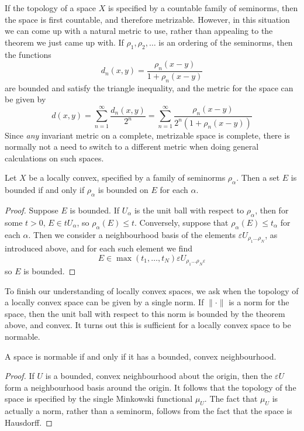 If the topology of a space $X$ is specified by a countable family of seminorms, then the space is first countable, and therefore metrizable. However, in this situation we can come up with a natural metric to use, rather than appealing to the theorem we just came up with. If $\rho_1, \rho_2, \dots$ is an ordering of the seminorms, then the functions
%
\[ d_n(x,y) = \frac{\rho_n(x - y)}{1 + \rho_n(x-y)} \]
%
are bounded and satisfy the triangle inequality, and the metric for the space can be given by
%
\[ d(x,y) = \sum_{n = 1}^\infty \frac{d_n(x,y)}{2^n} = \sum_{n = 1}^\infty \frac{\rho_n(x-y)}{2^n (1 + \rho_n(x-y))} \]
%
Since {\it any} invariant metric on a complete, metrizable space is complete, there is normally not a need to switch to a different metric when doing general calculations on such spaces.

\begin{theorem}
    Let $X$ be a locally convex, specified by a family of seminorms $\rho_\alpha$. Then a set $E$ is bounded if and only if $\rho_\alpha$ is bounded on $E$ for each $\alpha$.
\end{theorem}
\begin{proof}
    Suppose $E$ is bounded. If $U_\alpha$ is the unit ball with respect to $\rho_\alpha$, then for some $t > 0$, $E \in t U_\alpha$, so $\rho_\alpha(E) \leq t$. Conversely, suppose that $\rho_\alpha(E) \leq t_\alpha$ for each $\alpha$. Then we consider a neighbourhood basis of the elements $\varepsilon U_{\rho_1 \dots \rho_N}$, as introduced above, and for each such element we find
    \[ E \in \max(t_1, \dots, t_N) \varepsilon U_{\rho_1 \dots \rho_N \varepsilon} \]
    so $E$ is bounded.
\end{proof}

To finish our understanding of locally convex spaces, we ask when the topology of a locally convex space can be given by a single norm. If $\| \cdot \|$ is a norm for the space, then the unit ball with respect to this norm is bounded by the theorem above, and convex. It turns out this is sufficient for a locally convex space to be normable.

\begin{theorem}
    A space is normable if and only if it has a bounded, convex neighbourhood.
\end{theorem}
\begin{proof}
    If $U$ is a bounded, convex neighbourhood about the origin, then the $\varepsilon U$ form a neighbourhood basis around the origin. It follows that the topology of the space is specified by the single Minkowski functional $\mu_U$. The fact that $\mu_U$ is actually a norm, rather than a seminorm, follows from the fact that the space is Hausdorff.
\end{proof}

